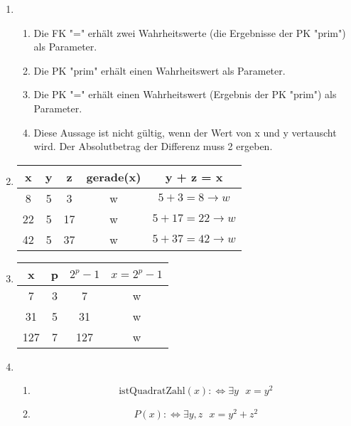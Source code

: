 \documentclass[a4paper]{article}
\begin{document}
\begin{enumerate}
		\item
		\begin{enumerate}
			\item Die FK "=" erhält zwei Wahrheitswerte (die Ergebnisse der PK "prim") als Parameter.
			\item Die PK "prim" erhält einen Wahrheitswert als Parameter.
			\item Die PK "=" erhält einen Wahrheitswert (Ergebnis der PK "prim") als Parameter.
			\item Diese Aussage ist nicht gültig, wenn der Wert von x und y vertauscht wird. Der Absolutbetrag der Differenz muss 2 ergeben.
		\end{enumerate}
		
		\item
		\begin{center}
			\begin{tabular}{|c|c|c|c|c|}
				\firsthline
					x & y & z & gerade(x) & y + z = x \\
				\hline
					8 & 5 & 3 & w & $ 5 + 3 = 8 \rightarrow w $ \\
				\hline
					22 & 5 & 17 & w & $5 + 17 = 22 \rightarrow w$ \\
				\hline
					42 & 5 & 37 & w & $5 + 37 = 42 \rightarrow w$ \\
				\hline
			\end{tabular}
		\end{center}
			
		\item
		\begin{center}
			\begin{tabular}{|c|c|c|c|}
				\firsthline
					x & p & $2^{p} - 1$ & $x = 2^{p} - 1$ \\
				\hline
					7 & 3 & 7 & w \\
				\hline
					31 & 5 & 31 & w \\
				\hline
					127 & 7 & 127 & w \\
				\hline
			\end{tabular}
		\end{center}
		
		\item
		\begin{enumerate}
			\item
			\begin{equation*}
				\text{istQuadratZahl}(x) :\Leftrightarrow \exists y \text{ } x = y^{2}
			\end{equation*}
			
			\item
			\begin{equation*}
				P(x) :\Leftrightarrow \exists y, z \text{ } x = y^{2} + z^{2}
			\end{equation*}
			

\end{enumerate}
\end{enumerate}
\end{document}
